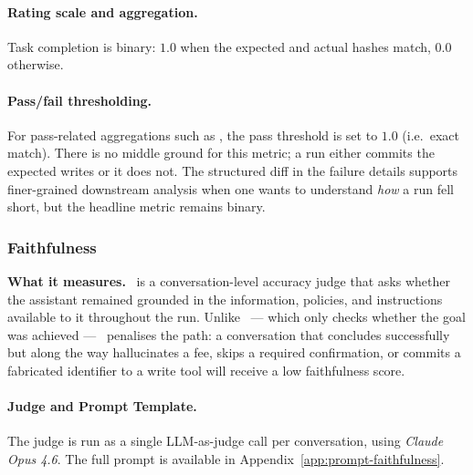 \paragraph{Rating scale and aggregation.} Task completion is binary: $1.0$ when the expected and actual hashes match, $0.0$ otherwise.

\paragraph{Pass/fail thresholding.} For pass-related aggregations such as \passatk, the pass threshold is set to $1.0$ (i.e.\ exact match). There is no middle ground for this metric; a run either commits the expected writes or it does not. The structured diff in the failure details supports finer-grained downstream analysis when one wants to understand \emph{how} a run fell short, but the headline metric remains binary.

\subsubsection{Faithfulness}
\label{app:metric-faithfulness}

\textbf{What it measures.} \metricfaithfulness~is a conversation-level accuracy judge that asks whether the assistant remained grounded in the information, policies, and instructions available to it throughout the run. Unlike \metrictaskcompletion~--- which only checks whether the goal was achieved --- \metricfaithfulness~penalises the path: a conversation that concludes successfully but along the way hallucinates a fee, skips a required confirmation, or commits a fabricated identifier to a write tool will receive a low faithfulness score. 

\paragraph{Judge and Prompt Template.} The judge is run as a single LLM-as-judge call per conversation, using \emph{Claude Opus 4.6}. The full prompt is available in Appendix~\ref{app:prompt-faithfulness}.

